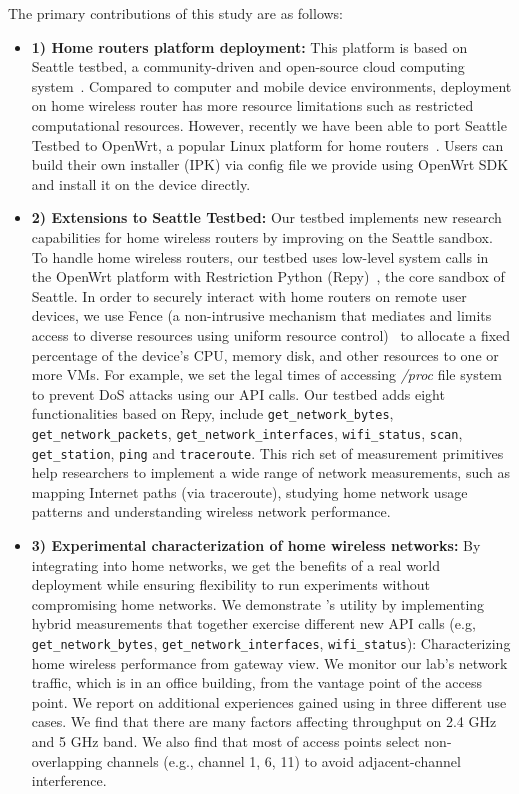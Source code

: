 The primary contributions of this study are as follows:
{\raggedright
\begin{itemize}
\item\textbf{1) Home routers platform deployment:} This platform is based on Seattle testbed, a community-driven and open-source cloud computing system~\cite{zhuang2013experience,cappos2009seattle}. Compared to computer and mobile device environments, deployment on home wireless router has more resource limitations such as restricted computational resources. However, recently we have been able to port Seattle Testbed to OpenWrt, a popular Linux platform for home routers~\cite{openwrt}. Users can build their own \sysname installer (IPK) via config file we provide using OpenWrt SDK and install it on the device directly. 

\item\textbf{2) Extensions to Seattle Testbed:} Our testbed implements new research capabilities for home wireless routers by improving on the Seattle sandbox. To handle home wireless routers, our testbed uses low-level system calls in the OpenWrt platform with Restriction Python (Repy)~\cite{cappos2010retaining}, the core sandbox of Seattle. In order to securely interact with home routers on remote user devices, we use Fence (a non-intrusive mechanism that mediates and limits access to diverse resources using uniform resource control)~\cite{li2015fence} to allocate a fixed percentage of the device's CPU, memory disk, and other resources to one or more VMs. For example, we set the legal times of accessing \emph{/proc} file system to prevent DoS attacks using our API calls. Our testbed adds eight functionalities based on Repy, include \texttt{get\_network\_bytes}, \texttt{get\_network\_packets}, \texttt{get\_network\_interfaces}, \texttt{wifi\_status}, \texttt{scan}, \texttt{get\_station}, \texttt{ping} and \texttt{traceroute}. This rich set of measurement primitives help researchers to implement a wide range of network measurements, such as mapping Internet paths (via traceroute), studying home network usage patterns and understanding wireless network performance.

\item\textbf{3) Experimental characterization of home wireless networks:} By integrating \sysname into home networks, we get the benefits of a real world deployment while ensuring flexibility to run experiments without compromising home networks. We demonstrate \sysname's utility by implementing hybrid measurements that together exercise different new API calls (e.g, \texttt{get\_network\_bytes}, \texttt{get\_network\_interfaces}, \texttt{wifi\_status}): Characterizing home wireless performance from gateway view. We monitor our lab's network traffic, which is in an office building, from the vantage point of the access point. We report on additional experiences gained using \sysname in three different use cases. We find that there are many factors affecting throughput on 2.4 GHz and 5 GHz band. We also find that most of access points select non-overlapping channels (e.g., channel 1, 6, 11) to avoid adjacent-channel interference. 
\end{itemize}
\par}
